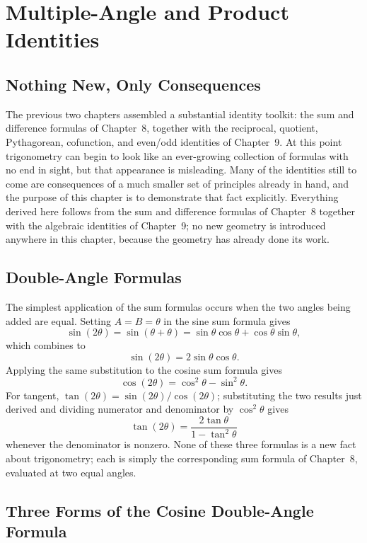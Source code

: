 \chapter{Multiple-Angle and Product Identities}
\label{ch:ch10-multiple-angle-product}

\section{Nothing New, Only Consequences}

The previous two chapters assembled a substantial identity toolkit: the sum
and difference formulas of Chapter~8, together with the reciprocal,
quotient, Pythagorean, cofunction, and even/odd identities of Chapter~9. At
this point trigonometry can begin to look like an ever-growing collection
of formulas with no end in sight, but that appearance is misleading. Many
of the identities still to come are consequences of a much smaller set of
principles already in hand, and the purpose of this chapter is to
demonstrate that fact explicitly. Everything derived here follows from the
sum and difference formulas of Chapter~8 together with the algebraic
identities of Chapter~9; no new geometry is introduced anywhere in this
chapter, because the geometry has already done its work.

\section{Double-Angle Formulas}

The simplest application of the sum formulas occurs when the two angles
being added are equal. Setting $A = B = \theta$ in the sine sum formula
gives
\[
\sin(2\theta) = \sin(\theta+\theta) = \sin\theta\cos\theta +
\cos\theta\sin\theta,
\]
which combines to
\[
\boxed{\sin(2\theta) = 2\sin\theta\cos\theta}.
\]
Applying the same substitution to the cosine sum formula gives
\[
\boxed{\cos(2\theta) = \cos^2\theta - \sin^2\theta}.
\]
For tangent, $\tan(2\theta) = \sin(2\theta)/\cos(2\theta)$; substituting the
two results just derived and dividing numerator and denominator by
$\cos^2\theta$ gives
\[
\boxed{\tan(2\theta) = \frac{2\tan\theta}{1-\tan^2\theta}}
\]
whenever the denominator is nonzero. None of these three formulas is a new
fact about trigonometry; each is simply the corresponding sum formula of
Chapter~8, evaluated at two equal angles.

\section{Three Forms of the Cosine Double-Angle Formula}

